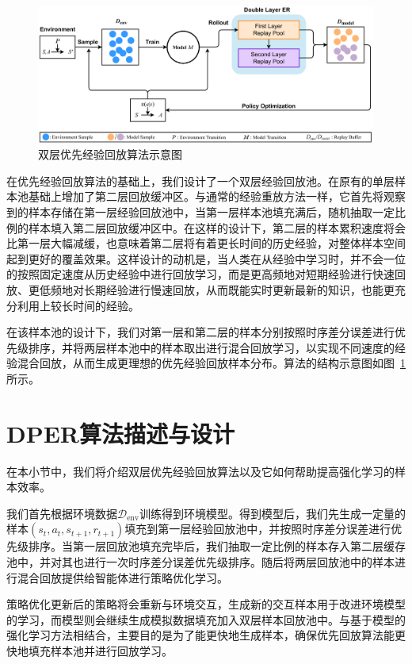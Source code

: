 \begin{figure}
\centering
\includegraphics[width=\textwidth]{figures/dber.pdf}
\caption{双层优先经验回放算法示意图}
\label{fig:algo-structure}
\end{figure}

在优先经验回放算法的基础上，我们设计了一个双层经验回放池。在原有的单层样本池基础上增加了第二层回放缓冲区。与通常的经验重放方法一样，它首先将观察到的样本存储在第一层经验回放池中，当第一层样本池填充满后，随机抽取一定比例的样本填入第二层回放缓冲区中。在这样的设计下，第二层的样本累积速度将会比第一层大幅减缓，也意味着第二层将有着更长时间的历史经验，对整体样本空间起到更好的覆盖效果。这样设计的动机是，当人类在从经验中学习时，并不会一位的按照固定速度从历史经验中进行回放学习，而是更高频地对短期经验进行快速回放、更低频地对长期经验进行慢速回放，从而既能实时更新最新的知识，也能更充分利用上较长时间的经验。

在该样本池的设计下，我们对第一层和第二层的样本分别按照时序差分误差进行优先级排序，并将两层样本池中的样本取出进行混合回放学习，以实现不同速度的经验混合回放，从而生成更理想的优先经验回放样本分布。算法的结构示意图如图~\ref{fig:algo-structure}所示。


\section{DPER算法描述与设计}

在本小节中，我们将介绍双层优先经验回放算法以及它如何帮助提高强化学习的样本效率。

我们首先根据环境数据$\mathcal{D}_{\text{env}}$训练得到环境模型。得到模型后，我们先生成一定量的样本$(s_t, a_t, s_{t+1}, r_{t+1})$填充到第一层经验回放池中，并按照时序差分误差进行优先级排序。当第一层回放池填充完毕后，我们抽取一定比例的样本存入第二层缓存池中，并对其也进行一次时序差分误差优先级排序。随后将两层回放池中的样本进行混合回放提供给智能体进行策略优化学习。

策略优化更新后的策略将会重新与环境交互，生成新的交互样本用于改进环境模型的学习，而模型则会继续生成模拟数据填充加入双层样本回放池中。与基于模型的强化学习方法相结合，主要目的是为了能更快地生成样本，确保优先回放算法能更快地填充样本池并进行回放学习。

